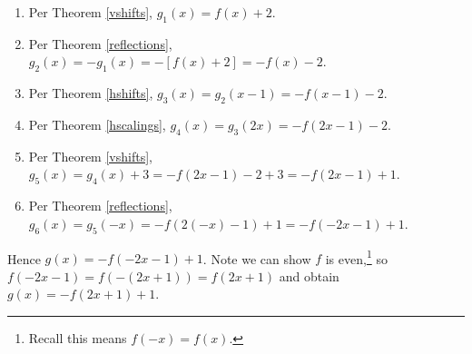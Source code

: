\begin{enumerate}

\item  Per Theorem \ref{vshifts}, $g_{1}(x) = f(x) + 2$.

\item  Per Theorem \ref{reflections}, $g_{2}(x) = -g_{1}(x) =  -[f(x) + 2] = -f(x)-2$.

\item  Per Theorem \ref{hshifts}, $g_{3}(x) = g_{2}(x-1) = -f(x-1)-2$.

\item  Per Theorem \ref{hscalings}, $g_{4}(x) = g_{3}(2x) =-f(2x-1)-2$.

\item  Per Theorem \ref{vshifts}, $g_{5}(x) = g_{4}(x)+3 = -f(2x-1)-2 + 3 = -f(2x-1)+1$.

\item  Per Theorem \ref{reflections}, $g_{6}(x) = g_{5}(-x) =  -f(2(-x)-1)+1 = -f(-2x-1)+1$.

\end{enumerate}

Hence $g(x) =  -f(-2x-1)+1$.  Note we can show $f$ is even,\footnote{Recall this means $f(-x) = f(x)$.} so $f(-2x-1) = f(-(2x+1)) = f(2x+1)$ and obtain $g(x) = -f(2x+1)+1$.  

